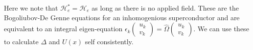 \documentclass{article}
\begin{document}
Here we note that $\mathcal{H}^*_e=\mathcal{H}_e$ as long as there is no applied field. These are the Bogoliubov-De Genne equations for an inhomogenious superconductor and are equivalent to an integral eigen-equation $\epsilon_k\left (\begin{array}{c} u_k \\ v_k \end{array}\right)=\hat{\Omega}\left (\begin{array}{c} u_k \\ v_k \end{array}\right)$. We can use these to calculate $\Delta$ and $U(x)$ self consistently. 
\end{document}
